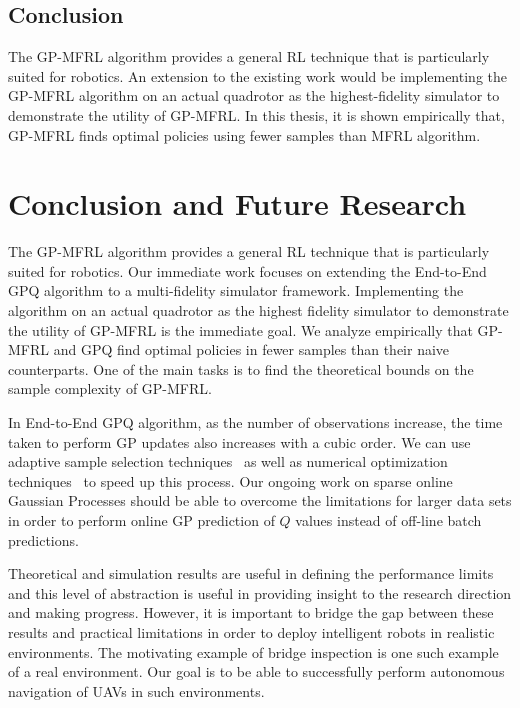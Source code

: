 \documentclass[12pt]{report}
\begin{document}
\section{Conclusion}
The GP-MFRL algorithm provides a general RL technique that is particularly suited for robotics. An extension to the existing work would be implementing the GP-MFRL algorithm on an actual quadrotor as the highest-fidelity simulator to demonstrate the utility of GP-MFRL. In this thesis, it is shown empirically that, GP-MFRL finds optimal policies using fewer samples than MFRL algorithm. 

\chapter{Conclusion and Future Research}
The GP-MFRL algorithm provides a general RL technique that is particularly suited for robotics. Our immediate work focuses on extending the End-to-End GPQ algorithm to a multi-fidelity simulator framework. Implementing the algorithm on an actual quadrotor as the highest fidelity simulator to demonstrate the utility of GP-MFRL is the immediate goal. We analyze empirically that GP-MFRL and GPQ find optimal policies in fewer samples than their naive counterparts. One of the main tasks is to find the theoretical bounds on the sample complexity of GP-MFRL.\par 
In End-to-End GPQ algorithm, as the number of observations increase, the time taken to perform GP updates also increases with a cubic order.  We can use adaptive sample selection techniques~\cite{osborne2010bayesian} as well as numerical optimization techniques~\cite{engel2005reinforcement} to speed up this process. Our ongoing work on sparse online Gaussian Processes \cite{csato2002sparse} should be able to overcome the limitations for larger data sets in order to perform online GP prediction of $Q$ values instead of off-line batch predictions.\par 
Theoretical and simulation results are useful in defining the performance limits and this level of abstraction is useful in providing insight to the research direction and making progress. However, it is important to bridge the gap between these results and practical limitations in order to deploy intelligent robots in realistic environments. The motivating example of bridge inspection is one such example of a real environment. Our goal is to be able to successfully perform autonomous navigation of UAVs in such environments. 

\end{document}
